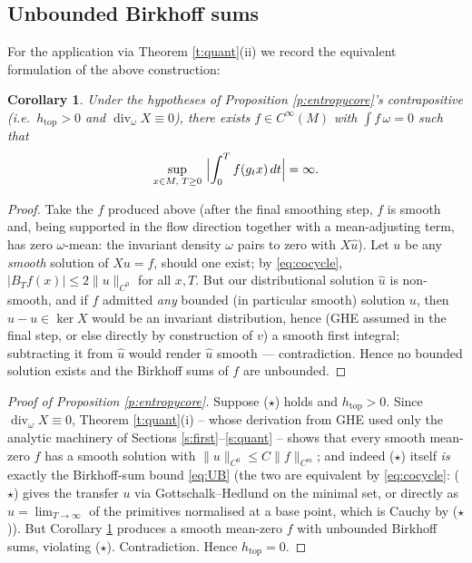 \documentclass[11pt]{amsart}
\theoremstyle{plain}
\newtheorem{corollary}[theorem]{Corollary}
\theoremstyle{definition}
\theoremstyle{remark}
\begin{document}
\subsection{Unbounded Birkhoff sums}\label{ss:unbound}

For the application via Theorem \ref{t:quant}(ii) we record the
equivalent formulation of the above construction:

\begin{corollary}\label{c:unbound}
Under the hypotheses of Proposition \ref{p:entropycore}'s
contrapositive (i.e.\ $h_{\mathrm{top}}>0$ and
$\operatorname{div}_\omega X\equiv0$), there exists
$f\in C^\infty(M)$ with $\int f\,\omega=0$ such that
\[
\sup_{x\in M,\;T\ge0}\ \Bigl|\int_0^T f(g_tx)\,dt\Bigr|=\infty .
\]
\end{corollary}

\begin{proof}
Take the $f$ produced above (after the final smoothing step, $f$ is
smooth and, being supported in the flow direction together with a
mean-adjusting term, has zero $\omega$-mean: the invariant density
$\omega$ pairs to zero with $X\hat u$).  Let $u$ be any
\emph{smooth} solution of $Xu=f$, should one exist; by
\eqref{eq:cocycle},
$|B_Tf(x)|\le 2\|u\|_{C^0}$ for all $x,T$.  But our distributional
solution $\hat u$ is non-smooth, and if $f$ admitted \emph{any}
bounded (in particular smooth) solution $u$, then
$\hat u-u\in\ker X$ would be an invariant distribution, hence
(GHE assumed in the final step, or else directly by construction of
$v$) a smooth first integral; subtracting it from $\hat u$ would
render $\hat u$ smooth --- contradiction.  Hence no bounded solution
exists and the Birkhoff sums of $f$ are unbounded.
\end{proof}

\begin{proof}[Proof of Proposition \ref{p:entropycore}]
Suppose ($\star$) holds and $h_{\mathrm{top}}>0$.  Since
$\operatorname{div}_\omega X\equiv0$, Theorem \ref{t:quant}(i) --
whose derivation from GHE used only the analytic machinery of
Sections \ref{s:first}--\ref{s:quant} -- shows that every smooth
mean-zero $f$ has a smooth solution with
$\|u\|_{C^0}\le C\|f\|_{C^m}$; and indeed ($\star$) itself
\emph{is} exactly the Birkhoff-sum bound
\eqref{eq:UB} (the two are equivalent by
\eqref{eq:cocycle}: ($\star$) gives the transfer $u$ via
Gottschalk--Hedlund \cite{GH} on the minimal set, or directly as
$u=\lim_{T\to\infty}$ of the primitives normalised at a base point,
which is Cauchy by ($\star$)).  But Corollary
\ref{c:unbound} produces a smooth mean-zero $f$ with unbounded
Birkhoff sums, violating ($\star$).  Contradiction.  Hence
$h_{\mathrm{top}}=0$.
\end{proof}
\end{document}
